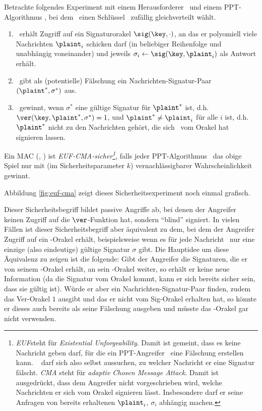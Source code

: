 \begin{definition} Betrachte folgendes Experiment mit einem
  Herausforderer \C~und einem PPT-Algorithmus \A, bei dem \C~einen
  Schlüssel \key~zufällig gleichverteilt wählt.
  \begin{enumerate}
  \item \A~erhält Zugriff auf ein Signaturorakel $\sig(\key,\cdot)$, an
    das er polyomiell viele Nachrichten $\plaint_i$ schicken darf (in
    beliebiger Reihenfolge und unabhängig voneinander) und jeweils
    $\sigma_i \leftarrow \sig(\key, \plaint_i)$ als Antwort erhält.
  \item \A~gibt als (potentielle) Fälschung ein Nachrichten-Signatur-Paar
    $(\plaint^*,\sigma^*)$ aus.
  \item \A~gewinnt, wenn $\sigma^*$ eine gültige Signatur für $\plaint^*$
    ist, d.h. $\ver(\key, \plaint^*, \sigma^*)=1$, und $\plaint^* \neq
    \plaint_i$ für alle $i$ ist, d.h. $\plaint^*$ nicht zu den Nachrichten
    gehört, die sich \A~vom Orakel hat signieren lassen.
  \end{enumerate}
\end{definition}

Ein MAC (\sig, \ver) ist \textit{EUF-CMA-sicher\footnote{\textit{EUF}\indexEUFCMA steht für \textit{Existential Unforgeability}. Damit ist
    gemeint, dass es keine Nachricht geben darf, für die ein PPT-Angreifer
    \A~eine Fälschung erstellen kann. \A~ darf sich also selbst aussuchen,
    zu welcher Nachricht er eine Signatur fälscht. \textit{CMA} steht für
    \textit{adaptiv Chosen Message Attack}. Damit ist ausgedrückt, dass dem
    Angreifer nicht vorgeschrieben wird, welche Nachrichten er sich vom
    Orakel signieren lässt. Insbesondere darf er seine Anfragen von bereits
    erhaltenen $\plaint_i$, $\sigma_i$ abhängig machen.}}, falls jeder
PPT-Algorithmus \A~das obige Spiel nur mit (im Sicherheitsparameter $k$)
vernachlässigbarer Wahrscheinlichkeit gewinnt.

Abbildung \ref{fig:euf-cma} zeigt dieses Sicherheitsexperiment noch
einmal grafisch.

Dieser Sicherheitsbegriff bildet passive Angriffe ab, bei denen der
Angreifer keinen Zugriff auf die $\ver$-Funktion hat, sondern "`blind"'
signiert. In vielen Fällen ist dieser Sicherheitsbegriff aber äquivalent
zu dem, bei dem der Angreifer Zugriff auf ein \ver-Orakel erhält,
beispielsweise wenn es für jede Nachricht \plaint~nur eine einzige (also
eindeutige) gültige Signatur $\sigma$ gibt. Die Hauptidee um diese
Äquivalenz zu zeigen ist die folgende: Gibt der Angreifer die
Signaturen, die er von seinem \sig-Orakel erhält, an sein \ver-Orakel
weiter, so erhält er keine neue Information (da die Signatur vom Orakel
kommt, kann er sich bereits sicher sein, dass sie gültig ist). Würde er
aber ein Nachrichten-Signatur-Paar finden, zudem das Ver-Orakel $1$
ausgibt und das er nicht vom Sig-Orakel erhalten hat, so könnte er
dieses auch bereits als seine Fälschung ausgeben und müsste das
\ver-Orakel gar nicht verwenden.


